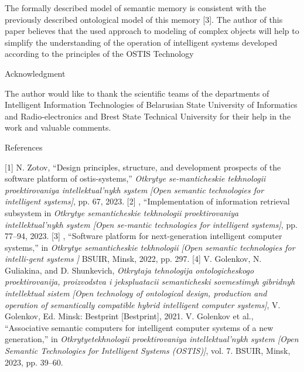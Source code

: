 \documentclass[10pt, a4paper]{article}
\begin{document}
\begin{multicols}{2}
\begin{itemize}
\end{itemize}

The formally described model of semantic memory
is consistent with the previously described ontological
model of this memory [3]. The author of this paper
believes that the used approach to modeling of complex
objects will help to simplify the understanding of the
operation of intelligent systems developed according to
the principles of the OSTIS Technology
\begin{center}
    Acknowledgment
\end{center}

The author would like to thank the scientific teams of
the departments of Intelligent Information Technologies
of Belarusian State University of Informatics and Radio-electronics and Brest State Technical University for their
help in the work and valuable comments.

\begin{center}
    References
\end{center}
[1] N. Zotov, “Design principles, structure, and development
prospects of the software platform of ostis-systems,” \textit{Otkrytye se-manticheskie tekhnologii proektirovaniya intellektual’nykh system} 
\textit{[Open semantic technologies for intelligent systems]}, pp. 67, 2023.
[2] \textthreequartersemdash \textthreequartersemdash,  “Implementation of information retrieval subsystem in \textit{Otkrytye semanticheskie
tekhnologii proektirovaniya intellektual’nykh system [Open se-mantic technologies for intelligent systems]}, pp. 77–94, 2023.
[3] \textthreequartersemdash \textthreequartersemdash, “Software platform for next-generation intelligent computer systems,” in \textit{Otkrytye semanticheskie tekhnologii  [Open semantic technologies for intelli-gent systems ]} BSUIR, Minsk, 2022, pp. 297.
[4] V. Golenkov, N. Guliakina, and D. Shunkevich,  \textit{Otkrytaja
tehnologija ontologicheskogo proektirovanija, proizvodstva
i jekspluatacii semanticheski sovmestimyh gibridnyh
intellektual sistem [Open technology of
ontological design, production and operation of semantically
compatible hybrid intelligent computer systems]}, V. Golenkov,
Ed. Minsk: Bestprint [Bestprint], 2021.
\noindent [5] V. Golenkov et al., “Associative semantic computers for intelligent computer systems of a new generation,” in \textit{Otkrytyetekhnologii proektirovaniya intellektual’nykh system [Open Semantic Technologies for Intelligent Systems (OSTIS)]}, vol. 7. BSUIR, Minsk, 2023, pp. 39–60.


\end{multicols}
\end{document}
